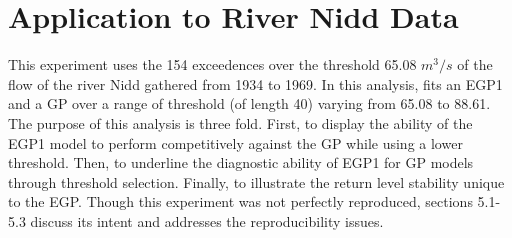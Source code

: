 \documentclass[12pt]{article}
\theoremstyle{definition}
\theoremstyle{definition}
\begin{document}
\section{Application to River Nidd Data}
This experiment uses the 154 exceedences over the threshold 65.08 $m^3/s$ of the flow of the river Nidd gathered from 1934 to 1969. In this analysis, \cite{papatawn} fits an EGP1 and a GP over a range of threshold (of length 40) varying from 65.08 to 88.61. The purpose of this analysis is three fold. First, to display the ability of the EGP1 model to perform competitively against the GP while using a lower threshold. Then, to underline the diagnostic ability of EGP1 for GP models through threshold selection. Finally, to illustrate the return level stability unique to the EGP. Though this experiment was not perfectly reproduced, sections 5.1-5.3 discuss its intent and addresses the reproducibility issues. 
\end{document}

